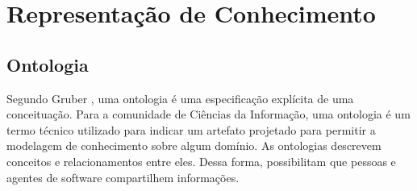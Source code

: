 
\section{Representação de Conhecimento} %
\label{sec:representação_de_conhecimento}




\subsection{Ontologia} %
\label{ssub:ontologia}


Segundo Gruber \cite{gruber1993tap}, uma ontologia é uma especificação explícita de uma conceituação. Para a comunidade de Ciências da Informação, uma ontologia é um termo técnico utilizado para indicar um artefato projetado para permitir a modelagem de conhecimento sobre algum domínio\cite{gruber2008oed}. As ontologias descrevem conceitos e relacionamentos entre eles. Dessa forma, possibilitam que pessoas e agentes de software compartilhem informações.




